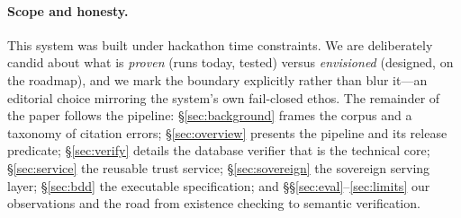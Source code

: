 \paragraph{Scope and honesty.}
This system was built under hackathon time constraints. We are deliberately
candid about what is \emph{proven} (runs today, tested) versus
\emph{envisioned} (designed, on the roadmap), and we mark the boundary
explicitly rather than blur it---an editorial choice mirroring the system's own
fail-closed ethos. The remainder of the paper follows the pipeline:
\S\ref{sec:background} frames the corpus and a taxonomy of citation errors;
\S\ref{sec:overview} presents the pipeline and its release predicate;
\S\ref{sec:verify} details the database verifier that is the technical core;
\S\ref{sec:service} the reusable trust service; \S\ref{sec:sovereign} the
sovereign serving layer; \S\ref{sec:bdd} the executable specification; and
\S\S\ref{sec:eval}--\ref{sec:limits} our observations and the road from
existence checking to semantic verification.
